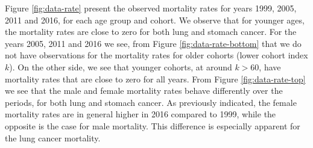 \newpar Figure \ref{fig:data-rate} present the observed mortality rates for years 1999, 2005, 2011 and 2016, for each age group and cohort. We observe that for younger ages, the mortality rates are close to zero for both lung and stomach cancer. For the years 2005, 2011 and 2016 we see, from Figure \ref{fig:data-rate-bottom} that we do not have observations for the  mortality rates for older cohorts (lower cohort index $k$). On the other side, we see that younger cohorts, at around $k > 60$, have mortality rates that are close to zero for all years. From Figure \ref{fig:data-rate-top} we see that the male and female mortality rates behave differently over the periods, for both lung and stomach cancer. As previously indicated, the female mortality rates are in general higher in 2016 compared to 1999, while the opposite is the case for male mortality. This difference is especially apparent for the lung cancer mortality. 

